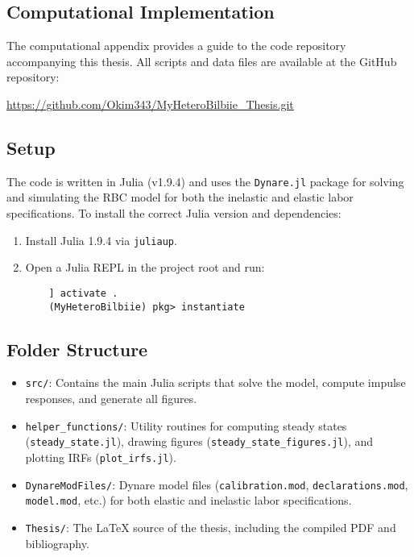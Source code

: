 \documentclass[a4paper,12pt]{article} %
\numberwithin{equation}{section} %
\numberwithin{figure}{section}
\numberwithin{table}{section}
\begin{document}
\begin{refsection}
\begin{appendices}
\pagebreak
\section{Computational Implementation}
\label{sec-app:codes}

The computational appendix provides a guide to the code repository accompanying this thesis. All scripts and data files are available at the GitHub repository:
\begin{center}
  \url{https://github.com/Okim343/MyHeteroBilbiie_Thesis.git}
\end{center}

\subsection{Setup}

The code is written in Julia (v1.9.4) and uses the \texttt{Dynare.jl} package for solving and simulating the 
RBC model for both the inelastic and elastic labor specifications. To install the correct Julia version and dependencies:

\begin{enumerate}
  \item Install Julia 1.9.4 via \texttt{juliaup}.
  \item Open a Julia REPL in the project root and run:
    \begin{verbatim}
    ] activate .
    (MyHeteroBilbiie) pkg> instantiate
    \end{verbatim}
\end{enumerate}

\subsection{Folder Structure}

\begin{itemize}
  \item \texttt{src/}:  
    Contains the main Julia scripts that solve the model, compute impulse responses, and generate all figures.
  \item \texttt{helper\_functions/}:  
    Utility routines for computing steady states (\texttt{steady\_state.jl}), drawing figures (\texttt{steady\_state\_figures.jl}), and plotting IRFs (\texttt{plot\_irfs.jl}).
  \item \texttt{DynareModFiles/}:  
    Dynare model files (\texttt{calibration.mod}, \texttt{declarations.mod}, \texttt{model.mod}, etc.) for both elastic and inelastic labor specifications.
  \item \texttt{Thesis/}:  
    The \LaTeX{} source of the thesis, including the compiled PDF and bibliography.
\end{itemize}


\end{appendices}
\end{refsection}
\end{document}
